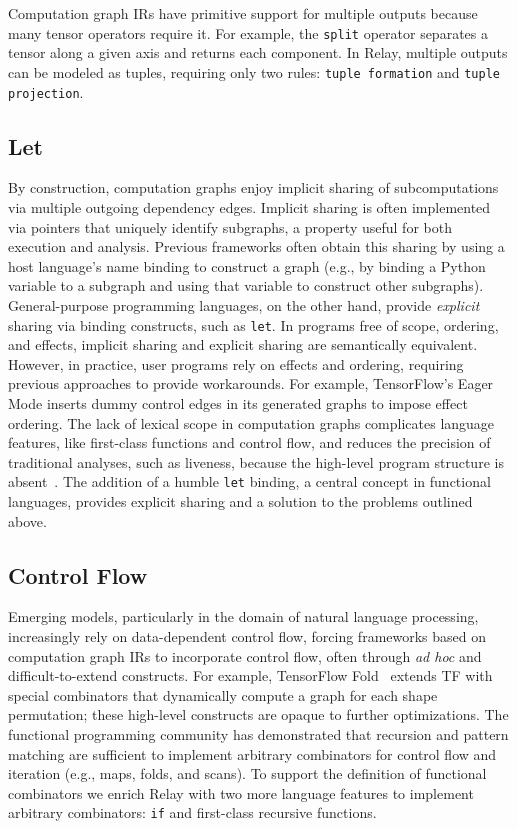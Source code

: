 Computation graph IRs have primitive support for multiple outputs
  because many tensor operators require it.
For example, the \verb|split| operator separates a tensor along a given axis
  and returns each component.
In Relay, multiple outputs can be modeled as tuples,
  requiring only two rules: \verb|tuple formation| and \verb|tuple projection|.

\subsection*{Let}

By construction, computation graphs enjoy implicit sharing of subcomputations
  via multiple outgoing dependency edges.
Implicit sharing is often implemented via pointers that uniquely identify subgraphs,
  a property useful for both execution and analysis.
Previous frameworks often obtain this sharing by using a host
  language's name binding to construct a graph (e.g., by binding a Python variable
  to a subgraph and using that variable to construct other subgraphs).
General-purpose programming languages, on the other hand, provide \textit{explicit}
  sharing via binding constructs, such as \verb|let|.
In programs free of scope, ordering, and effects, implicit sharing
  and explicit sharing are semantically equivalent.
However, in practice, user programs rely on effects and ordering,
  requiring previous approaches to provide workarounds.
For example, TensorFlow's Eager Mode inserts dummy control edges
  in its generated graphs to impose effect ordering.
The lack of lexical scope in computation graphs complicates language features,
  like first-class functions and control flow,
  and reduces the precision of traditional analyses,
  such as liveness,
  because the high-level program structure is absent~\citep{funarg, funarg_sol}.
The addition of a humble \verb|let| binding, a central concept in functional languages,
  provides explicit sharing and a solution to the problems outlined above.

\subsection*{Control Flow}


Emerging models, particularly in the domain of natural language processing, increasingly
  rely on data-dependent control flow, forcing frameworks based on computation graph IRs
  to incorporate control flow, often through \textit{ad hoc} and difficult-to-extend constructs.
For example, TensorFlow Fold~\citep{tf_fold} extends TF with special combinators that
  dynamically compute a graph for each shape permutation;
  these high-level constructs are opaque to further optimizations.
The functional programming community has demonstrated that recursion and pattern matching are sufficient
  to implement arbitrary combinators for control flow and iteration (e.g., maps, folds, and scans).
To support the definition of functional combinators
  we enrich Relay with two more language
  features to implement arbitrary combinators: \verb|if| and first-class recursive functions.

